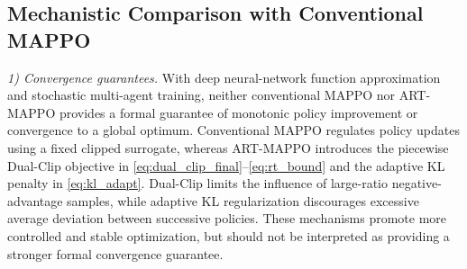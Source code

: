 \documentclass[lettersize,journal]{IEEEtran}
\newcommand{\hladd}[1]{{\color{blue}#1}}
\begin{document}



\subsection{\hladd{Mechanistic Comparison with Conventional MAPPO}}
\label{subsec:theory_comparison}

\hladd{\emph{1) Convergence guarantees.}
With deep neural-network function approximation and stochastic multi-agent
training, neither conventional MAPPO nor ART-MAPPO provides a formal guarantee
of monotonic policy improvement or convergence to a global optimum. Conventional
MAPPO regulates policy updates using a fixed clipped surrogate, whereas
ART-MAPPO introduces the piecewise Dual-Clip objective in
\eqref{eq:dual_clip_final}--\eqref{eq:rt_bound} and the adaptive KL penalty in
\eqref{eq:kl_adapt}. Dual-Clip limits the influence of large-ratio
negative-advantage samples, while adaptive KL regularization discourages
excessive average deviation between successive policies. These mechanisms
promote more controlled and stable optimization, but should not be interpreted
as providing a stronger formal convergence guarantee.}
\end{document}
